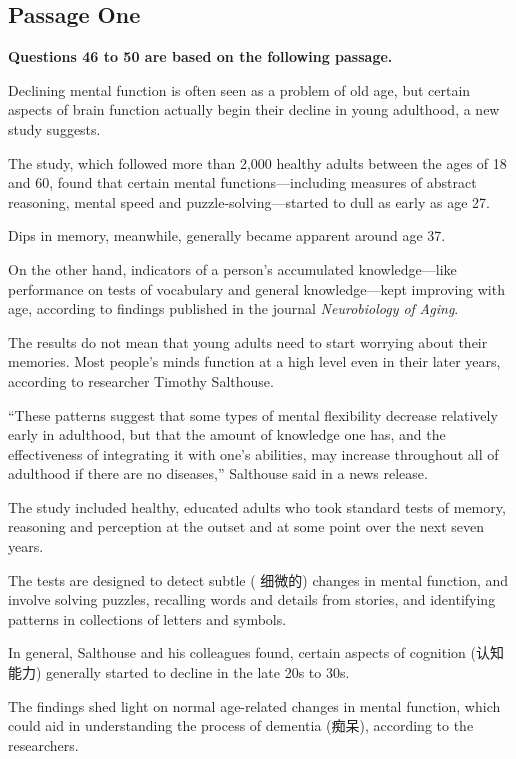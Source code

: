 \documentclass[UTF8,11pt]{ctexart}
\begin{document}
\subsection*{\textbf{Passage One}}


\textbf{Questions 46 to 50 are based on the following passage.}


Declining mental function is often seen as a problem of old age, but certain aspects of brain function actually begin their decline in young adulthood, a new study suggests.


The study, which followed more than 2,000 healthy adults between the ages of 18 and 60, found that certain mental functions—including measures of abstract reasoning, mental speed and puzzle-solving—started to dull as early as age 27.


Dips in memory, meanwhile, generally became apparent around age 37.


On the other hand, indicators of a person’s accumulated knowledge—like performance on tests of vocabulary and general knowledge—kept improving with age, according to findings published in the journal\textit{ Neurobiology of} \textit{Aging}.


The results do not mean that young adults need to start worrying about their memories. Most people’s minds function at a high level even in their later years, according to researcher Timothy Salthouse.


“These patterns suggest that some types of mental flexibility decrease relatively early in adulthood, but that the amount of knowledge one has, and the effectiveness of integrating it with one’s abilities, may increase throughout all of adulthood if there are no diseases,” Salthouse said in a news release.


The study included healthy, educated adults who took standard tests of memory, reasoning and perception at the outset and at some point over the next seven years.


The tests are designed to detect subtle ( 细微的) changes in mental function, and involve solving puzzles, recalling words and details from stories, and identifying patterns in collections of letters and symbols.


In general, Salthouse and his colleagues found, certain aspects of cognition (认知能力) generally started to decline in the late 20s to 30s.


The findings shed light on normal age-related changes in mental function, which could aid in understanding the process of dementia (痴呆), according to the researchers.
\end{document}
